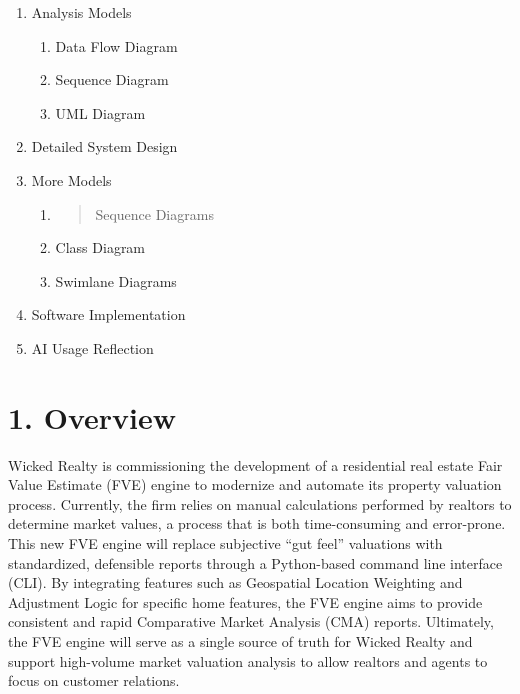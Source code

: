 \documentclass[
]{article}
\begin{document}
\begin{enumerate}
  \begin{enumerate}
  \def\labelenumii{\alph{enumii}.}
  \item
    Performance Requirements
  \item
    Maintainability Requirements
  \item
    Availability Requirements
  \item
    Other SQA Req
  \end{enumerate}
\item
  Analysis Models

  \begin{enumerate}
  \def\labelenumii{\alph{enumii}.}
  \item
    Data Flow Diagram
  \item
    Sequence Diagram
  \item
    UML Diagram
  \end{enumerate}
\item
  Detailed System Design
\item
  More Models

  \begin{enumerate}
  \def\labelenumii{\alph{enumii}.}
  \item
    \begin{quote}
    Sequence Diagrams
    \end{quote}
  \item
    Class Diagram
  \item
    Swimlane Diagrams
  \end{enumerate}
\item
  Software Implementation
\item
  AI Usage Reflection
\end{enumerate}

\hypertarget{overview}{%
\section{1. Overview}\label{overview}}

Wicked Realty is commissioning the development of a residential real
estate Fair Value Estimate (FVE) engine to modernize and automate its
property valuation process. Currently, the firm relies on manual
calculations performed by realtors to determine market values, a process
that is both time-consuming and error-prone. This new FVE engine will
replace subjective ``gut feel'' valuations with standardized, defensible
reports through a Python-based command line interface (CLI). By
integrating features such as Geospatial Location Weighting and
Adjustment Logic for specific home features, the FVE engine aims to
provide consistent and rapid Comparative Market Analysis (CMA) reports.
Ultimately, the FVE engine will serve as a single source of truth for
Wicked Realty and support high-volume market valuation analysis to allow
realtors and agents to focus on customer relations.
\end{document}
